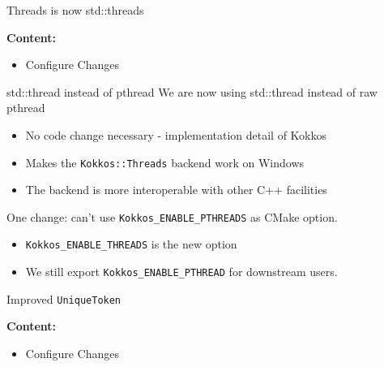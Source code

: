 

\begin{frame}[fragile]{}

  {\Huge Threads is now std::threads}

  \vspace{10pt}

  \textbf{Content:}
  \begin{itemize}
    \item {Configure Changes}
  \end{itemize}

  \vspace{-20pt}

\end{frame}


\begin{frame}[fragile]{std::thread instead of pthread}
   We are now using std::thread instead of raw pthread
  \begin{itemize}
    \item {No code change necessary - implementation detail of Kokkos}
    \item {Makes the \texttt{Kokkos::Threads} backend work on Windows}
    \item {The backend is more interoperable with other C++ facilities}
  \end{itemize}

  One change: can't use \texttt{Kokkos\_ENABLE\_PTHREADS} as CMake option.
  \begin{itemize}
    \item \texttt{Kokkos\_ENABLE\_THREADS} is the new option
    \item We still export \texttt{Kokkos\_ENABLE\_PTHREAD} for downstream users.
  \end{itemize}
\end{frame}

\begin{frame}[fragile]{}

  {\Huge Improved \texttt{UniqueToken}}

  \vspace{10pt}

  \textbf{Content:}
  \begin{itemize}
    \item {Configure Changes}
  \end{itemize}

  \vspace{-20pt}

\end{frame}


